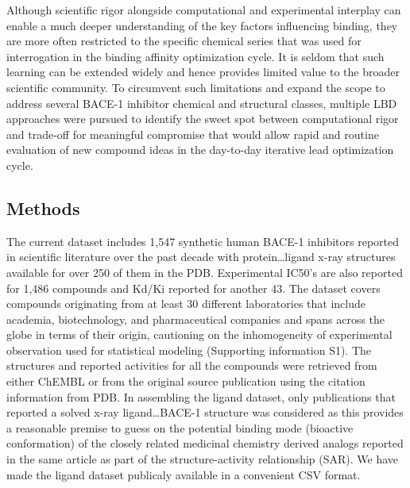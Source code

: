 Although scientific rigor alongside computational and experimental interplay can enable a much deeper understanding of the key factors influencing binding, they are more often restricted to the specific chemical series that was used for interrogation in the binding affinity optimization cycle.  It is seldom that such learning can be extended widely and hence provides limited value to the broader scientific community.  To circumvent such limitations and expand the scope to address several BACE-1 inhibitor chemical and structural classes, multiple LBD approaches were pursued to identify the sweet spot between computational rigor and trade-off for meaningful compromise that would allow rapid and routine evaluation of new compound ideas in the day-to-day iterative lead optimization cycle.  

\subsection{Methods}

The current dataset includes 1,547 synthetic human BACE-1 inhibitors reported in scientific literature over the past decade with protein…ligand x-ray structures available for over 250 of them in the PDB.  Experimental IC50’s are also reported for 1,486 compounds and Kd/Ki reported for another 43.  The dataset covers compounds originating from at least 30 different laboratories that include academia, biotechnology, and pharmaceutical companies and spans across the globe in terms of their origin, cautioning on the inhomogeneity of experimental observation used for statistical modeling (Supporting information S1).  The structures and reported activities for all the compounds were retrieved from either ChEMBL or from the original source publication using the citation information from PDB.  In assembling the ligand dataset, only publications that reported a solved x-ray ligand…BACE-1 structure was considered as this provides a reasonable premise to guess on the potential binding mode (bioactive conformation) of the closely related medicinal chemistry derived analogs reported in the same article as part of the structure-activity relationship (SAR).  We have made the ligand dataset publicaly available in a convenient CSV format.

